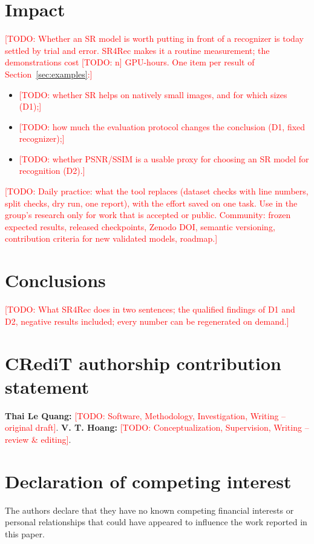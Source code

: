 \documentclass[preprint,12pt]{elsarticle}
\newcommand{\todo}[1]{\textcolor{red}{[TODO: #1]}}
\begin{document}
\section{Impact}
\label{sec:impact}

\todo{Whether an SR model is worth putting in front of a recognizer is today settled by trial and
error. SR4Rec makes it a routine measurement; the demonstrations cost \todo{n} GPU-hours. One item
per result of Section~\ref{sec:examples}:}
\begin{itemize}
  \item \todo{whether SR helps on natively small images, and for which sizes (D1);}
  \item \todo{how much the evaluation protocol changes the conclusion (D1, fixed recognizer);}
  \item \todo{whether PSNR/SSIM is a usable proxy for choosing an SR model for recognition (D2).}
\end{itemize}
\todo{Daily practice: what the tool replaces (dataset checks with line numbers, split checks,
dry run, one report), with the effort saved on one task. Use in the group's research only for work
that is accepted or public. Community: frozen expected results, released checkpoints, Zenodo DOI,
semantic versioning, contribution criteria for new validated models, roadmap.}

\section{Conclusions}
\label{sec:conclusions}

\todo{What SR4Rec does in two sentences; the qualified findings of D1 and D2, negative results
included; every number can be regenerated on demand.}

\section*{CRediT authorship contribution statement}
\textbf{Thai Le Quang:} \todo{Software, Methodology, Investigation, Writing -- original draft}.
\textbf{V. T. Hoang:} \todo{Conceptualization, Supervision, Writing -- review \& editing}.

\section*{Declaration of competing interest}
The authors declare that they have no known competing financial interests or personal relationships
that could have appeared to influence the work reported in this paper.
\end{document}
